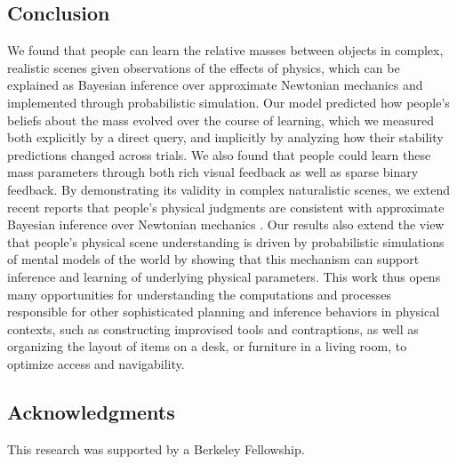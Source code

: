 \documentclass[10pt,letterpaper]{article}
\begin{document}
\subsection{Conclusion}

We found that people can learn the relative masses between objects in
complex, realistic scenes given observations of the effects of
physics, which can be explained as Bayesian inference over approximate
Newtonian mechanics and implemented through probabilistic simulation.
Our model predicted how people's beliefs about the mass evolved over
the course of learning, which we measured both explicitly by a direct
query, and implicitly by analyzing how their stability predictions
changed across trials. We also found that people could learn these
mass parameters through both rich visual feedback as well as sparse
binary feedback. By demonstrating its validity in complex naturalistic
scenes, we extend recent reports that people's physical judgments are
consistent with approximate Bayesian inference over Newtonian
mechanics \cite{Sanborn2013}. Our results also extend the view that
people's physical scene understanding is driven by probabilistic
simulations of mental models of the world \cite{Battaglia2013} by
showing that this mechanism can support inference and learning of
underlying physical parameters. This work thus opens many
opportunities for understanding the computations and processes
responsible for other sophisticated planning and inference behaviors
in physical contexts, such as constructing improvised tools and
contraptions, as well as organizing the layout of items on a desk, or
furniture in a living room, to optimize access and navigability.


\subsection{Acknowledgments}

{\small This research was supported by a Berkeley Fellowship.}



\renewcommand{\bibliographytypesize}{\small}
\setlength{\bibleftmargin}{.125in}
\setlength{\bibindent}{-\bibleftmargin}


\end{document}

